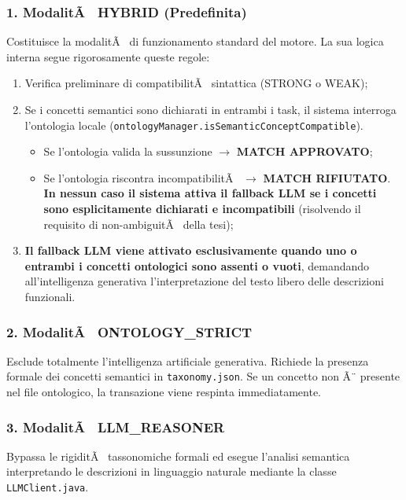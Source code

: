 ﻿\documentclass[11pt, a4paper]{report}
\begin{document}
\subsubsection{1. ModalitÃ  HYBRID (Predefinita)}
Costituisce la modalitÃ  di funzionamento standard del motore. La sua logica interna segue rigorosamente queste regole:
\begin{enumerate}
    \item Verifica preliminare di compatibilitÃ  sintattica (STRONG o WEAK);
    \item Se i concetti semantici sono dichiarati in entrambi i task, il sistema interroga l'ontologia locale (\texttt{ontologyManager.isSemanticConceptCompatible}). 
    \begin{itemize}
        \item Se l'ontologia valida la sussunzione $\rightarrow$ \textbf{MATCH APPROVATO};
        \item Se l'ontologia riscontra incompatibilitÃ  $\rightarrow$ \textbf{MATCH RIFIUTATO}. \textbf{In nessun caso il sistema attiva il fallback LLM se i concetti sono esplicitamente dichiarati e incompatibili} (risolvendo il requisito di non-ambiguitÃ  della tesi);
    \end{itemize}
    \item \textbf{Il fallback LLM viene attivato esclusivamente quando uno o entrambi i concetti ontologici sono assenti o vuoti}, demandando all'intelligenza generativa l'interpretazione del testo libero delle descrizioni funzionali.
\end{enumerate}

\subsubsection{2. ModalitÃ  ONTOLOGY\_STRICT}
Esclude totalmente l'intelligenza artificiale generativa. Richiede la presenza formale dei concetti semantici in \texttt{taxonomy.json}. Se un concetto non Ã¨ presente nel file ontologico, la transazione viene respinta immediatamente.

\subsubsection{3. ModalitÃ  LLM\_REASONER}
Bypassa le rigiditÃ  tassonomiche formali ed esegue l'analisi semantica interpretando le descrizioni in linguaggio naturale mediante la classe \texttt{LLMClient.java}.
\end{document}
